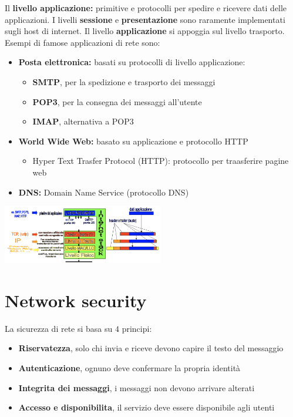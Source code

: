 \documentclass{article}
\begin{document}
Il \textbf{livello applicazione:} primitive e protocolli per spedire e ricevere dati delle applicazioni. I livelli \textbf{sessione} e \textbf{presentazione} sono raramente implementati sugli host di internet. Il livello \textbf{applicazione} si appoggia sul livello trasporto. Esempi di famose applicazioni di rete sono:
\begin{itemize}
    \item \textbf{Posta elettronica:} basati su protocolli di livello applicazione:
    \begin{itemize}
        \item \textbf{SMTP}, per la spedizione e trasporto dei messaggi
        \item \textbf{POP3}, per la consegna dei messaggi all'utente
        \item \textbf{IMAP}, alternativa a POP3
    \end{itemize}
    \item \textbf{World Wide Web:} basato su applicazione e protocollo HTTP
    \begin{itemize}
        \item Hyper Text Trasfer Protocol (HTTP): protocollo per traasferire pagine web
    \end{itemize}
    \item \textbf{DNS:} Domain Name Service (protocollo DNS)
\end{itemize}
\begin{center}
    \includegraphics[width=7cm]{img/app.png}
\end{center}

\section{Network security}
La sicurezza di rete si basa su $4$ principi:
\begin{itemize}
    \item \textbf{Riservatezza}, solo chi invia e riceve devono capire il testo del messaggio
    \item \textbf{Autenticazione}, ognuno deve confermare la propria identità
    \item \textbf{Integrita dei messaggi}, i messaggi non devono arrivare alterati
    \item \textbf{Accesso e disponibilita}, il servizio deve essere disponibile agli utenti
\end{itemize}
\end{document}
